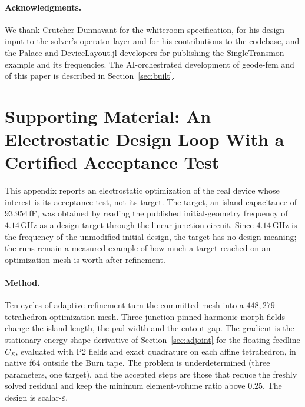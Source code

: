 \documentclass{anvil-paper}
\begin{document}
\paragraph{Acknowledgments.}
We thank Crutcher Dunnavant for the whiteroom specification, for his
design input to the solver's operator layer and for his contributions to
the codebase, and the Palace and
DeviceLayout.jl developers for publishing the SingleTransmon example and
its frequencies. The AI-orchestrated development of geode-fem and of this
paper is described in Section~\ref{sec:built}.

\clearpage
\appendix
\section{Supporting Material: An Electrostatic Design Loop With a Certified Acceptance Test}
\label{sec:appendix-supporting}

This appendix reports an electrostatic optimization of the real device
whose interest is its acceptance test, not its target. The target, an
island capacitance of $93.954$\,fF, was obtained by reading the published
initial-geometry frequency of $4.14$\,GHz as a design target through the
linear junction circuit. Since $4.14$\,GHz is the frequency of the
unmodified initial design, the target has no design meaning; the runs
remain a measured example of how much a target reached on an
optimization mesh is worth after refinement.

\paragraph{Method.}
Ten cycles of adaptive refinement turn the committed mesh into a
$448{,}279$-tetrahedron optimization mesh. Three junction-pinned harmonic
morph fields change the island length, the pad width and the cutout gap.
The gradient is the stationary-energy shape derivative of
Section~\ref{sec:adjoint} for the floating-feedline $C_\Sigma$, evaluated
with P2 fields and exact quadrature on each affine tetrahedron, in native
f64 outside the Burn tape. The problem is underdetermined (three
parameters, one target), and the accepted steps are those that reduce the
freshly solved residual and keep the minimum element-volume ratio above
$0.25$. The design is scalar-$\bar\varepsilon$.
\end{document}
